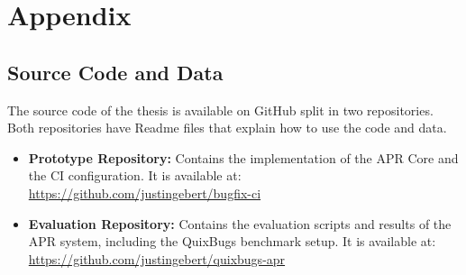\appendix

\chapter{Appendix} \label{chapter:appendix}

\section{Source Code and Data}
The source code of the thesis is available on GitHub split in two repositories. Both repositories have Readme files that explain how to use the code and data.
\begin{itemize}
    \item \textbf{Prototype Repository:} Contains the implementation of the APR Core and the CI configuration. It is available at: \url{https://github.com/justingebert/bugfix-ci}
    \item \textbf{Evaluation Repository:} Contains the evaluation scripts and results of the APR system, including the QuixBugs benchmark setup. It is available at: \url{https://github.com/justingebert/quixbugs-apr}
\end{itemize}


